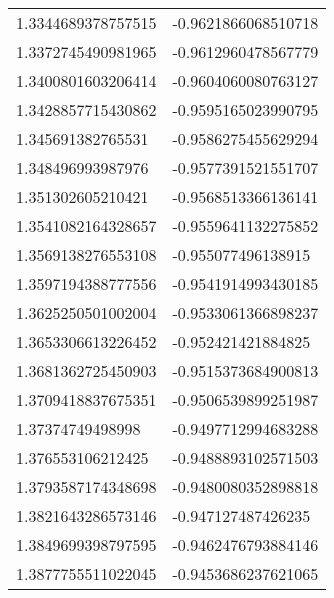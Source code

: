 \begin{supertabular}{ll}
1.3344689378757515  & -0.9621866068510718   \\
1.3372745490981965  & -0.9612960478567779   \\
1.3400801603206414  & -0.9604060080763127   \\
1.3428857715430862  & -0.9595165023990795   \\
1.345691382765531   & -0.9586275455629294   \\
1.348496993987976   & -0.9577391521551707   \\
1.351302605210421   & -0.9568513366136141   \\
1.3541082164328657  & -0.9559641132275852   \\
1.3569138276553108  & -0.955077496138915    \\
1.3597194388777556  & -0.9541914993430185   \\
1.3625250501002004  & -0.9533061366898237   \\
1.3653306613226452  & -0.952421421884825    \\
1.3681362725450903  & -0.9515373684900813   \\
1.3709418837675351  & -0.9506539899251987   \\
1.37374749498998    & -0.9497712994683288   \\
1.376553106212425   & -0.9488893102571503   \\
1.3793587174348698  & -0.9480080352898818   \\
1.3821643286573146  & -0.947127487426235    \\
1.3849699398797595  & -0.9462476793884146   \\
1.3877755511022045  & -0.9453686237621065   \\
\end{supertabular}
